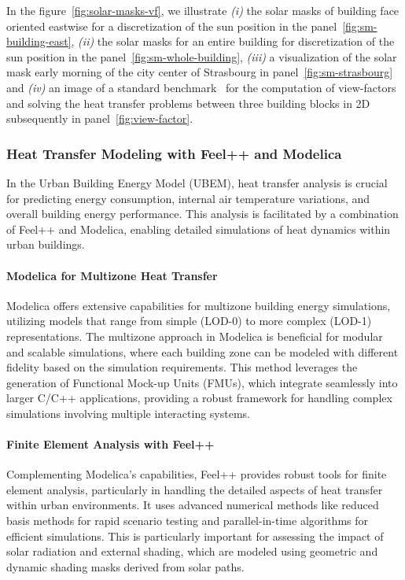 \documentclass[runningheads]{llncs}
\begin{document}
In the figure~\ref{fig:solar-masks-vf}, we illustrate \textit{(i)} the solar masks of building face oriented eastwise for a discretization of the sun position in the panel~\ref{fig:sm-building-east}, \textit{(ii)} the solar masks for an entire building for discretization of the sun position in the panel~\ref{fig:sm-whole-building}, \textit{(iii)} a visualization of the solar mask early morning of the city center of Strasbourg in panel~\ref{fig:sm-strasbourg} and \textit{(iv)} an image of a standard benchmark~\cite{van_eck_surface_2016} for the computation of view-factors and solving the heat transfer problems between three building blocks in 2D subsequently in panel~\ref{fig:view-factor}.

\subsubsection{Heat Transfer Modeling with Feel++ and Modelica}
In the Urban Building Energy Model (UBEM), heat transfer analysis is crucial for predicting energy consumption, internal air temperature variations, and overall building energy performance. This analysis is facilitated by a combination of Feel++ and Modelica, enabling detailed simulations of heat dynamics within urban buildings.

\paragraph{Modelica for Multizone Heat Transfer}
Modelica offers extensive capabilities for multizone building energy simulations, utilizing models that range from simple (LOD-0) to more complex (LOD-1) representations. The multizone approach in Modelica is beneficial for modular and scalable simulations, where each building zone can be modeled with different fidelity based on the simulation requirements. This method leverages the generation of Functional Mock-up Units (FMUs), which integrate seamlessly into larger C/C++ applications, providing a robust framework for handling complex simulations involving multiple interacting systems.

\paragraph{Finite Element Analysis with Feel++}
Complementing Modelica's capabilities, Feel++ provides robust tools for finite element analysis, particularly in handling the detailed aspects of heat transfer within urban environments. It uses advanced numerical methods like reduced basis methods for rapid scenario testing and parallel-in-time algorithms for efficient simulations. This is particularly important for assessing the impact of solar radiation and external shading, which are modeled using geometric and dynamic shading masks derived from solar paths.
\end{document}
